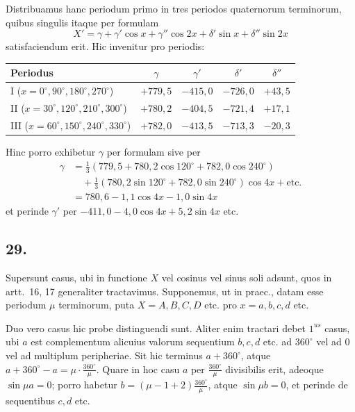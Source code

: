 \documentclass[12pt,a4paper]{article}
\theoremstyle{plain}
\begin{document}
Distribuamus hanc periodum primo in tres periodos quaternorum terminorum, quibus singulis itaque per formulam
\[
X' = \gamma + \gamma'\cos x + \gamma''\cos 2x + \delta'\sin x + \delta''\sin 2x
\]
satisfaciendum erit. Hic invenitur pro periodis:

\begin{center}
\begin{tabular}{l|cccc} Periodus & $\gamma$ & $\gamma'$ & $\delta'$ & $\delta''$ \\
\hline I ($x=0^{\circ},90^{\circ},180^{\circ},270^{\circ}$) & $+779{,}5$ & $-415{,}0$ & $-726{,}0$ & $+43{,}5$ \\
II ($x=30^{\circ},120^{\circ},210^{\circ},300^{\circ}$) & $+780{,}2$ & $-404{,}5$ & $-721{,}4$ & $+17{,}1$ \\
III ($x=60^{\circ},150^{\circ},240^{\circ},330^{\circ}$) & $+782{,}0$ & $-413{,}5$ & $-713{,}3$ & $-20{,}3$
\end{tabular}
\end{center}

Hinc porro exhibetur $\gamma$ per formulam sive per
\begin{align*}
\gamma &= \frac{1}{3}(779{,}5 + 780{,}2\cos 120^{\circ} + 782{,}0\cos 240^{\circ})\\
&\quad + \frac{1}{3}(780{,}2\sin 120^{\circ} + 782{,}0\sin 240^{\circ})\cos 4x + \text{etc.}\\
&= 780{,}6 - 1{,}1\cos 4x - 1{,}0\sin 4x
\end{align*}
et perinde $\gamma'$ per $-411{,}0 - 4{,}0\cos 4x + 5{,}2\sin 4x$ etc.


\subsection*{29.}

Supersunt casus, ubi in functione $X$ vel cosinus vel sinus soli adsunt, quos in artt.\ 16, 17 generaliter tractavimus. Supponemus, ut in praec., datam esse
periodum $\mu$ terminorum, puta $X = A, B, C, D$ etc. pro $x = a, b, c, d$ etc.

Duo vero casus hic probe distinguendi sunt. Aliter enim tractari debet
$1^{us}$ casus, ubi $a$ est complementum alicuius valorum sequentium $b, c, d$ etc. ad
$360^{\circ}$ vel ad $0$ vel ad multiplum peripheriae. Sit hic terminus $a + 360^{\circ}$, atque $a + 360^{\circ} - a = \mu\cdot\frac{360^{\circ}}{\mu}$. Quare in hoc casu $a$ per $\frac{360^{\circ}}{\mu}$
divisibilis erit, adeoque $\sin\mu a = 0$; porro habetur $b = (\mu - 1 + 2)\frac{360^{\circ}}{\mu}$, atque $\sin\mu b = 0$, et perinde de sequentibus $c, d$ etc.
\end{document}
